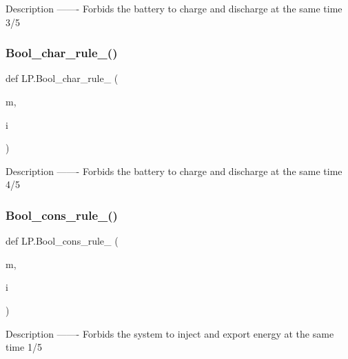 \begin{DoxyVerb}Description
-------
Forbids the battery to charge and discharge at the same time 3/5
\end{DoxyVerb}
 \mbox{\label{namespace_l_p_a1507e408c138290f403907a50e2b5d1c}} 
\subsubsection{\texorpdfstring{Bool\+\_\+char\+\_\+rule\+\_()}{Bool\_char\_rule\_4()}}
{\footnotesize\ttfamily def L\+P.\+Bool\+\_\+char\+\_\+rule\+\_ (\begin{DoxyParamCaption}\item[{}]{m,  }\item[{}]{i }\end{DoxyParamCaption})}

\begin{DoxyVerb}Description
-------
Forbids the battery to charge and discharge at the same time 4/5
\end{DoxyVerb}
 \mbox{\label{namespace_l_p_a85d28f45143d7ae45b7e2358dfe14923}} 
\subsubsection{\texorpdfstring{Bool\+\_\+cons\+\_\+rule\+\_()}{Bool\_cons\_rule\_1()}}
{\footnotesize\ttfamily def L\+P.\+Bool\+\_\+cons\+\_\+rule\+\_ (\begin{DoxyParamCaption}\item[{}]{m,  }\item[{}]{i }\end{DoxyParamCaption})}

\begin{DoxyVerb}Description
-------
Forbids the system to inject and export energy at the same time 1/5
\end{DoxyVerb}
 \mbox{\label{namespace_l_p_a748be39fe52af9daef16738ff06030b7}} 
